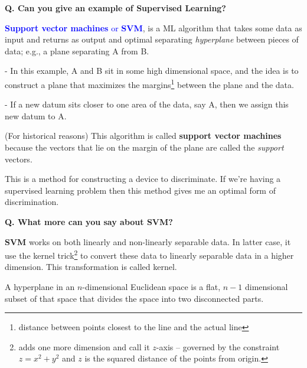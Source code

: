 \begin{frame}[fragile]{\textbf{Q. Can you give an example of Supervised Learning?}}
  \vspace{.4em}
  \begin{wideitemize}
    \item \textcolor{blue}{\textbf{Support vector machines} or \textbf{SVM}},
    is a ML algorithm that takes some data as input and returns as output
    and optimal separating \textit{hyperplane} between pieces of data; e.g., a plane separating A from B.
    \begin{wideitemize}
      \item[-] In this example, A and B sit in some high dimensional space, and the idea is to
      construct a plane that maximizes the margins\footnote{distance between points closest
      to the line and the actual line} between the plane and the data.
      \item[-] If a new datum sits closer to one area of the data, say A, then
      we assign this new datum to A.
    \end{wideitemize}
    \item (For historical reasons) This algorithm is called \textbf{support
    vector machines} because the vectors that lie on the margin of the plane are
    called the \textit{support} vectors.
  \end{wideitemize}

  \begin{framed}
  This is a method for constructing a device to discriminate. If we're having
  a supervised learning problem then this method gives me an optimal form of
  discrimination.
  \end{framed}

\end{frame}



\begin{frame}[fragile]{\textbf{Q. What more can you say about SVM?}}
  \vspace{.4em}
  \begin{wideitemize}
    \item \textbf{SVM} works on both linearly and non-linearly separable data. In latter case, it use
    the kernel trick\footnote{adds one more dimension and call it $z$-axis -- governed by the
    constraint $z = x^2 + y^2$ and $z$ is the squared distance of the points from origin.} to convert
    these data to linearly separable data in a higher dimension. This transformation is called kernel.
    \item A hyperplane in an $n$-dimensional Euclidean space is a flat, $n-1$ dimensional subset of that
    space that divides the space into two disconnected parts.
  \end{wideitemize}

\end{frame}

